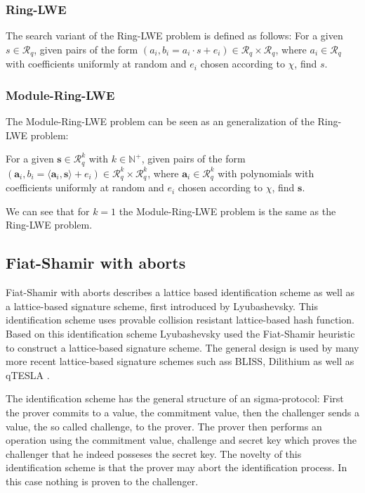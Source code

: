 \documentclass[a4paper,titlepage]{article}
\begin{document}
 \subsubsection{Ring-LWE} %
 The search variant of the Ring-LWE problem is defined as follows:
 For a given $s \in \mathcal{R}_q$, given pairs of the form $(a_i, b_i = a_i \cdot s + e_i) \in \mathcal{R}_q \times \mathcal{R}_q$, where $a_i \in \mathcal{R}_q$ with coefficients uniformly at random and $e_i$ chosen according to $\chi$, find $s$.
 
 \subsubsection{Module-Ring-LWE} %
 The Module-Ring-LWE problem can be seen as an generalization of the Ring-LWE problem:

For a given $\bm{s} \in \mathcal{R}_q^k$ with $k \in \mathds{N}^+$, given pairs of the form $(\bm{a}_i, b_i = \langle \bm{a}_i, \bm{s} \rangle + e_i) \in \mathcal{R}_q^k \times \mathcal{R}_q^k$, where $\bm{a}_i \in \mathcal{R}_q^k$ with polynomials with coefficients uniformly at random and $e_i$ chosen according to $\chi$, find $\bm{s}$.

We can see that for $k = 1$ the Module-Ring-LWE problem is the same as the Ring-LWE problem.

\subsection{Fiat-Shamir with aborts}
Fiat-Shamir with aborts describes a lattice based identification scheme as well as a lattice-based signature scheme, first introduced by Lyubashevsky.  \cite{fiatshamirabort}  This identification scheme uses provable collision resistant lattice-based hash function. Based on this identification scheme Lyubashevsky used the Fiat-Shamir heuristic \cite{fiatshamir} to construct a lattice-based signature scheme. The general design is used by many more recent lattice-based signature schemes such ass BLISS, Dilithium as well as qTESLA \cite{bliss, dilithium, qtesla}.


The identification scheme has the general structure of an sigma-protocol: First the prover commits to a value, the commitment value, then the challenger sends a value, the so called challenge, to the prover. The prover then performs an operation using the commitment value, challenge and secret key which proves the challenger that he indeed posseses the secret key. The novelty of this identification scheme is that the prover may abort the identification process. In this case nothing is proven to the challenger.
\end{document}
